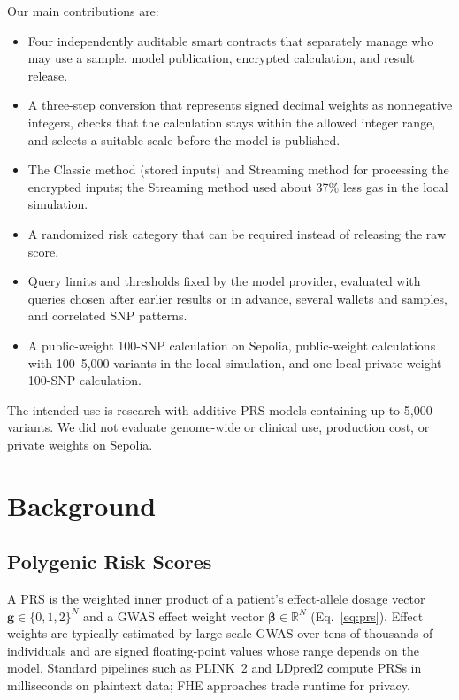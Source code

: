 \documentclass[10pt]{article}
\begin{document}
\smallskip\noindent Our main contributions are:
\begin{itemize}
  \item Four independently auditable smart contracts that separately manage who may use
        a sample, model publication, encrypted calculation, and result release.
  \item A three-step conversion that represents signed decimal weights as nonnegative
        integers, checks that the calculation stays within the allowed integer range,
        and selects a suitable scale before the model is published.
  \item The Classic method (stored inputs) and Streaming method for processing the encrypted inputs;
        the Streaming method used about 37\% less gas in the local simulation.
  \item A randomized risk category that can be required instead of releasing
        the raw score.
  \item Query limits and thresholds fixed by the model provider, evaluated with queries
        chosen after earlier results or in advance, several wallets and samples, and
        correlated SNP patterns.
  \item A public-weight 100-SNP calculation on Sepolia, public-weight calculations with 100--5,000
        variants in the local simulation, and one local private-weight 100-SNP calculation.
\end{itemize}

The intended use is research with additive PRS models containing up to 5,000 variants.  We did not
evaluate genome-wide or clinical use, production cost, or private weights on Sepolia.

\section{Background}
\label{sec:background}

\subsection{Polygenic Risk Scores}

A PRS is the weighted inner product of a patient's effect-allele dosage vector
$\mathbf{g} \in \{0,1,2\}^N$ and a GWAS effect weight vector $\boldsymbol{\beta}
\in \mathbb{R}^N$ (Eq.~\ref{eq:prs}).  Effect weights are typically estimated by
large-scale GWAS over tens of thousands of individuals and are signed floating-point
values whose range depends on the model.  Standard pipelines such as PLINK~2
\citep{chang2015plink} and LDpred2 \citep{prive2020ldpred2} compute PRSs in
milliseconds on plaintext data; FHE approaches trade runtime for privacy.
\end{document}
